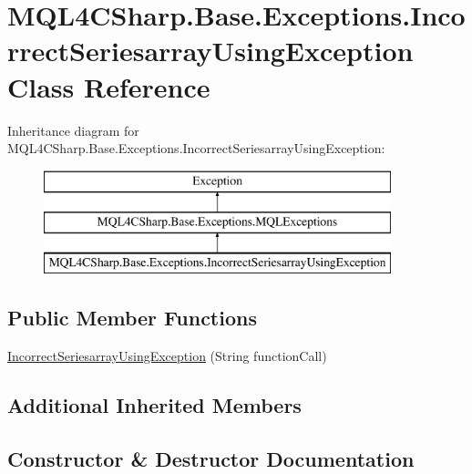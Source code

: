 \hypertarget{class_m_q_l4_c_sharp_1_1_base_1_1_exceptions_1_1_incorrect_seriesarray_using_exception}{}\section{M\+Q\+L4\+C\+Sharp.\+Base.\+Exceptions.\+Incorrect\+Seriesarray\+Using\+Exception Class Reference}
\label{class_m_q_l4_c_sharp_1_1_base_1_1_exceptions_1_1_incorrect_seriesarray_using_exception}
Inheritance diagram for M\+Q\+L4\+C\+Sharp.\+Base.\+Exceptions.\+Incorrect\+Seriesarray\+Using\+Exception\+:\begin{figure}[H]
\begin{center}
\leavevmode
\includegraphics[height=3.000000cm]{class_m_q_l4_c_sharp_1_1_base_1_1_exceptions_1_1_incorrect_seriesarray_using_exception}
\end{center}
\end{figure}
\subsection*{Public Member Functions}
\begin{DoxyCompactItemize}
\item 
\hyperlink{class_m_q_l4_c_sharp_1_1_base_1_1_exceptions_1_1_incorrect_seriesarray_using_exception_aae25cd9b89a12ccb55fcad31d1c4eda5}{Incorrect\+Seriesarray\+Using\+Exception} (String function\+Call)
\end{DoxyCompactItemize}
\subsection*{Additional Inherited Members}


\subsection{Constructor \& Destructor Documentation}
